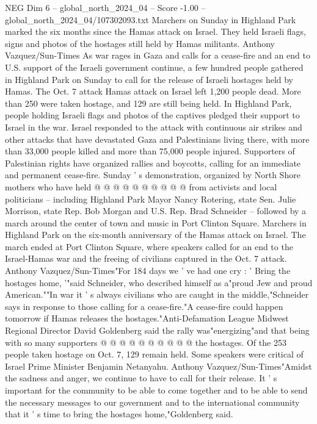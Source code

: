\begin{textsample}{NEG Dim 6 – global\_north\_2024\_04 – Score -1.00 – global\_north\_2024\_04/107302093.txt}  \label{ex:f6_neg_366}
Marchers on Sunday in Highland Park marked the six months since the Hamas attack on Israel.
They held Israeli flags, signs and photos of the hostages still held by Hamas militants.
Anthony Vazquez/Sun-Times As war rages in Gaza and calls for a cease-fire and an end to U.S. support of the Israeli government continue, a few hundred people gathered in Highland Park on Sunday to call for the release of Israeli hostages held by Hamas.
The Oct. 7 attack Hamas attack on Israel left 1,200 people dead.
More than 250 were taken hostage, and 129 are still being held.
In Highland Park, people holding Israeli flags and photos of the captives pledged their support to Israel in the war.
Israel responded to the attack with continuous air strikes and other attacks that have devastated Gaza and Palestinians living there, with more than 33,000 people killed and more than 75,000 people injured.
Supporters of Palestinian rights have organized rallies and boycotts, calling for an immediate and permanent cease-fire.
Sunday ' s demonstration, organized by North Shore mothers who have held @ @ @ @ @ @ @ @ @ @ from activists and local politicians -- including Highland Park Mayor Nancy Rotering, state Sen.
Julie Morrison, state Rep.
Bob Morgan and U.S.
Rep.
Brad Schneider -- followed by a march around the center of town and music in Port Clinton Square.
Marchers in Highland Park on the six-month anniversary of the Hamas attack on Israel.
The march ended at Port Clinton Square, where speakers called for an end to the Israel-Hamas war and the freeing of civilians captured in the Oct. 7 attack.
Anthony Vazquez/Sun-Times"For 184 days we ' ve had one cry : ' Bring the hostages home, '"said Schneider, who described himself as a"proud Jew and proud American.""In war it ' s always civilians who are caught in the middle,"Schneider says in response to those calling for a cease-fire."A cease-fire could happen tomorrow if Hamas releases the hostages."Anti-Defamation League Midwest Regional Director David Goldenberg said the rally was"energizing"and that being with so many supporters @ @ @ @ @ @ @ @ @ @ the hostages.
Of the 253 people taken hostage on Oct. 7, 129 remain held.
Some speakers were critical of Israel Prime Minister Benjamin Netanyahu.
Anthony Vazquez/Sun-Times"Amidst the sadness and anger, we continue to have to call for their release.
It ' s important for the community to be able to come together and to be able to send the necessary messages to our government and to the international community that it ' s time to bring the hostages home,"Goldenberg said.

\end{textsample}
